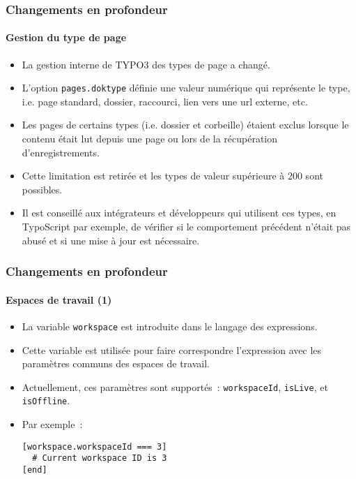 
\begin{frame}[fragile]
	\frametitle{Changements en profondeur}
	\framesubtitle{Gestion du type de page}

	\begin{itemize}
		\item La gestion interne de TYPO3 des types de page a changé.
		\item L'option \texttt{pages.doktype} définie une valeur numérique qui représente le type,
			i.e. page standard, dossier, raccourci, lien vers une url externe, etc.
		\item Les pages de certains types (i.e. dossier et corbeille) étaient exclus lorsque le contenu
			était lut depuis une page ou lors de la récupération d'enregistrements.
		\item Cette limitation est retirée et les types de valeur supérieure à 200 sont possibles.
		\item Il est conseillé aux intégrateurs et développeurs qui utilisent ces types, en TypoScript par exemple,
			de vérifier si le comportement précédent n'était pas abusé et si une mise à jour est nécessaire.
	\end{itemize}

\end{frame}


\begin{frame}[fragile]
	\frametitle{Changements en profondeur}
	\framesubtitle{Espaces de travail (1)}

	\lstset{basicstyle=\smaller\ttfamily}

	\begin{itemize}
		\item La variable \texttt{workspace} est introduite dans le langage des expressions.
		\item Cette variable est utilisée pour faire correspondre l'expression avec les
			paramètres communs des espaces de travail.
		\item Actuellement, ces paramètres sont supportés~:\newline
			\small
				\texttt{workspaceId}, \texttt{isLive}, et \texttt{isOffline}.
			\normalsize
		\item Par exemple~:
\begin{lstlisting}
[workspace.workspaceId === 3]
  # Current workspace ID is 3
[end]
\end{lstlisting}

	\end{itemize}

\end{frame}

